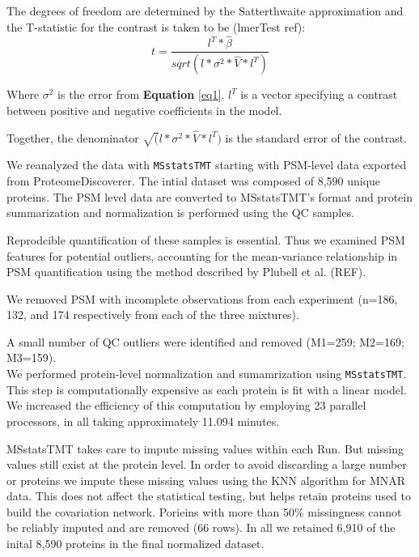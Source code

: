 \documentclass[11pt]{elife}\usepackage[]{graphicx}\usepackage[]{color}
\begin{document}
The degrees of freedom are determined by the Satterthwaite approximation
and the T-statistic for the contrast is taken to be (lmerTest ref): \\

\begin{equation}
	t = \frac{l^T * \hat{\beta}}{sqrt(l * \sigma^2 * \hat{V} * l^T)}
\end{equation}

Where $\sigma^2$ is the error from \textbf{Equation} \ref{eq1}.
$l^T$ is a vector specifying a contrast between positive and 
negative coefficients in the model.

Together, the denominator $\sqrt(l * \sigma^2 * \hat{V} * l^T)$ is the 
standard error of the contrast.


We reanalyzed the data with \texttt{MSstatsTMT} starting with PSM-level data 
exported from ProteomeDiscoverer. The intial dataset was composed of 8,590 
unique proteins. The PSM level data are converted to MSstatsTMT's format 
and protein summarization and normalization is performed using the QC samples. 

Reprodcible quantification of these samples is essential. Thus we examined PSM features for potential outliers, accounting for the mean-variance relationship in 
PSM quantification using the method described by Plubell et al. (REF).

We removed PSM with incomplete observations from each experiment 
(n=186, 132, and 174 respectively from each of the three mixtures).

A small number of QC outliers were identified and removed (M1=259; M2=169;
M3=159). \\

We performed protein-level normalization and sumamrization using
\texttt{MSstatsTMT}. This step is computationally expensive as each protein is
fit with a linear model. We increased the efficiency of this computation by
employing 23 parallel processors, in all taking approximately 11.094 minutes.

MSstatsTMT takes care to impute missing values within each Run. But missing
values still exist at the protein level. In order to avoid discarding a large
number or proteins we impute these missing values using the KNN algorithm for
MNAR data. This does not affect the statistical testing, but helps retain
proteins used to build the covariation network.
Porieins with more than 50\% missingness cannot be reliably imputed and are
removed (66 rows). In all we retained 6,910 of the inital 8,590 proteins in the 
final normalized dataset.  \\
\end{document}

